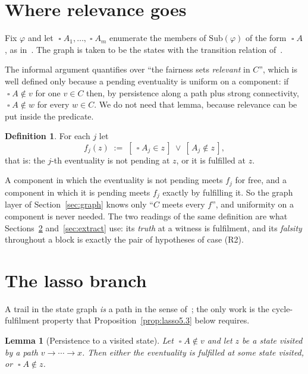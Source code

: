 \documentclass[11pt,a4paper]{article}
\newtheorem{lemma}[theorem]{Lemma}
\theoremstyle{definition}
\newtheorem{definition}[theorem]{Definition}
\newcommand{\Always}{\mathop{\square}}
\newcommand{\Sub}{\mathrm{Sub}}
\begin{document}
\section{Where relevance goes}\label{sec:evpred}

Fix $\varphi$ and let $\Always A_1,\dots,\Always A_m$ enumerate the members of
$\Sub(\varphi)$ of the form $\Always A$, as in~\cite{m4}.  The graph is taken
to be the states with the transition relation of~\cite[Def.~2.3]{m4}.

The informal argument quantifies over ``the fairness sets \emph{relevant} in
$C$'', which is well defined only because a pending eventuality is uniform on a
component: if $\Always A\notin v$ for one $v\in C$ then, by persistence along a
path plus strong connectivity, $\Always A\notin w$ for every $w\in C$.  We do
not need that lemma, because relevance can be put inside the predicate.

\begin{definition}\label{def:evpred}
For each $j$ let
\[
  f_j(z) \;:=\; [\,\Always A_j\in z\,]\ \vee\ [\,A_j\notin z\,],
\]
that is: the $j$-th eventuality is not pending at $z$, or it is fulfilled at
$z$.
\end{definition}

A component in which the eventuality is not pending meets $f_j$ for free, and a
component in which it is pending meets $f_j$ exactly by fulfilling it.  So the
graph layer of Section~\ref{sec:graph} knows only ``$C$ meets every $f$'', and
uniformity on a component is never needed.  The two readings of the same
definition are what Sections~\ref{sec:lasso} and~\ref{sec:extract} use: its
\emph{truth} at a witness is fulfilment, and its \emph{falsity} throughout a
block is exactly the pair of hypotheses of case (R2).

\section{The lasso branch}\label{sec:lasso}

A trail in the state graph \emph{is} a path in the sense of~\cite[\S5]{m4}; the
only work is the cycle-fulfilment property that
Proposition~\ref{prop:lasso5.3} below requires.

\begin{lemma}[Persistence to a visited state]\label{lem:persistto}
Let $\Always A\notin v$ and let $z$ be a state visited by a path
$v\to\cdots\to x$.  Then either the eventuality is fulfilled at some state
visited, or $\Always A\notin z$.
\end{lemma}
\end{document}
